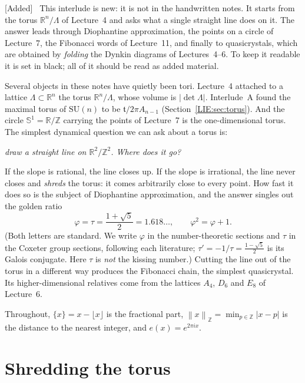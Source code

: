 \documentclass[11pt,openany]{book}
\theoremstyle{plain}
\theoremstyle{definition}
\theoremstyle{remark}
\newenvironment{addedblock}{\par\color{addcol}\noindent\textsf{\small[Added]}\ }{\par}
\newcommand{\R}{\mathbb{R}}
\newcommand{\Z}{\mathbb{Z}}
\newcommand{\Sph}{\mathbb{S}}          %
\newcommand{\Lat}{\Lambda}             %
\newcommand{\abs}[1]{\left\lvert #1 \right\rvert}
\newcommand{\norm}[1]{\left\lVert #1 \right\rVert}
\begin{document}
\begin{addedblock}
This interlude is new: it is not in the handwritten notes. It starts from the torus $\R^n/\Lat$ of
Lecture~4 and asks what a single straight line does on it. The answer leads through Diophantine
approximation, the points on a circle of Lecture~7, the Fibonacci words of Lecture~11, and finally
to quasicrystals, which are obtained by \emph{folding} the Dynkin diagrams of Lectures~4--6. To keep
it readable it is set in black; all of it should be read as added material.
\end{addedblock}

Several objects in these notes have quietly been tori. Lecture~4 attached to a lattice $\Lat\subset\R^n$
the torus $\R^n/\Lat$, whose volume is $\abs{\det\Lat}$. Interlude~A found the maximal torus of
$\mathrm{SU}(n)$ to be $\mathfrak t/2\pi A_{n-1}$ (Section~\ref{LIE:sec:torus}). And the circle
$\Sph^1=\R/\Z$ carrying the points of Lecture~7 is the one-dimensional torus. The simplest dynamical
question we can ask about a torus is:
\begin{center}
\emph{draw a straight line on $\R^2/\Z^2$. Where does it go?}
\end{center}
If the slope is rational, the line closes up. If the slope is irrational, the line never closes and
\emph{shreds} the torus: it comes arbitrarily close to every point. How fast it does so is the subject
of Diophantine approximation, and the answer singles out the golden ratio
\[
  \varphi=\tau=\frac{1+\sqrt5}2=1.618\ldots,\qquad \varphi^2=\varphi+1 .
\]
(Both letters are standard. We write $\varphi$ in the number-theoretic sections and $\tau$ in the
Coxeter group sections, following each literature; $\tau'=-1/\tau=\frac{1-\sqrt5}{2}$ is its Galois
conjugate. Here $\tau$ is \emph{not} the kissing number.) Cutting the line out of the torus in a
different way produces the Fibonacci chain, the simplest quasicrystal. Its higher-dimensional
relatives come from the lattices $A_4$, $D_6$ and $E_8$ of Lecture~6.

Throughout, $\{x\}=x-\lfloor x\rfloor$ is the fractional part, $\norm{x}_{\Z}=\min_{p\in\Z}\abs{x-p}$
is the distance to the nearest integer, and $e(x)=e^{2\pi ix}$.

\section{Shredding the torus}
\label{ERG:sec:torus}
\end{document}
